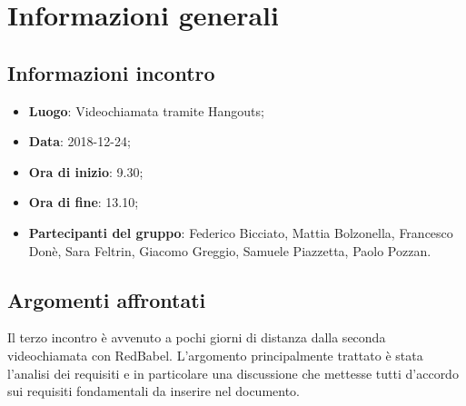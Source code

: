 \section{Informazioni generali}

\subsection{Informazioni incontro}
\begin{itemize}
\item \textbf{Luogo}: Videochiamata tramite Hangouts;
\item \textbf{Data}: 2018-12-24;
\item \textbf{Ora di inizio}: 9.30;
\item \textbf{Ora di fine}: 13.10;
\item \textbf{Partecipanti del gruppo}: Federico Bicciato, Mattia Bolzonella, 
Francesco Donè, Sara Feltrin, Giacomo Greggio, Samuele Piazzetta, Paolo Pozzan.
\end{itemize}

\subsection{Argomenti affrontati}
Il terzo incontro è avvenuto a pochi giorni di distanza dalla seconda videochiamata con RedBabel. L'argomento principalmente trattato è stata l'analisi dei requisiti e in particolare una discussione che mettesse tutti d'accordo sui requisiti fondamentali da inserire nel documento.
